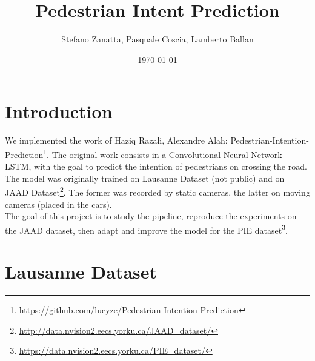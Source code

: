 \documentclass[11pt]{article}
\title{Pedestrian Intent Prediction}
\author{Stefano Zanatta, Pasquale Coscia, Lamberto Ballan}
\date{\today}
\begin{document}
\maketitle
\section{Introduction}
    We implemented the work of Haziq Razali, Alexandre Alah:
    Pedestrian-Intention-Prediction\footnote{\url{https://github.com/lucyze/Pedestrian-Intention-Prediction}}.
    The original work consists in a Convolutional Neural Network - LSTM, with the goal to predict the intention
    of pedestrians on crossing the road.\\
    The model was originally trained on Lausanne Dataset (not public) and on JAAD Dataset\footnote{\url{http://data.nvision2.eecs.yorku.ca/JAAD_dataset/}}.
    The former was recorded by static cameras, the latter on moving cameras (placed in the cars).\\
    The goal of this project is to study the pipeline, reproduce the experiments on the JAAD dataset, then adapt and
    improve the model for the PIE dataset\footnote{\url{https://data.nvision2.eecs.yorku.ca/PIE_dataset/}}.

\section{Lausanne Dataset}
\end{document}
